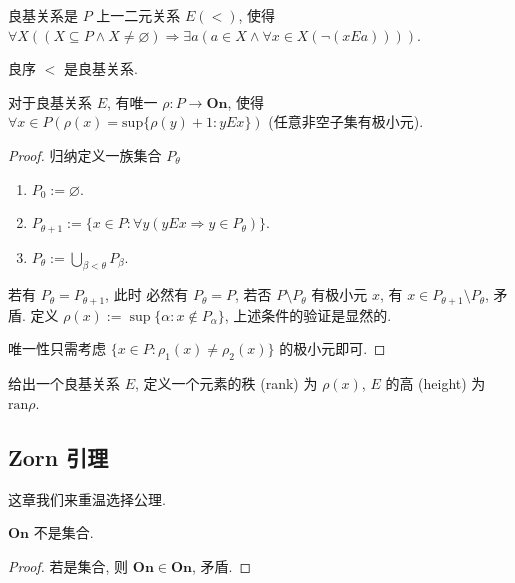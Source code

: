 \begin{definition}
    良基关系是 \(P\) 上一二元关系 \(E (<)\), 使得 \(\forall X ((X \subseteq P \land X \neq \varnothing) \Rightarrow \exists a (a \in X \land \forall x \in X (\neg(x E a))))\).
\end{definition}

\begin{example}
    良序 \(<\) 是良基关系.
\end{example}

\begin{theorem}
    对于良基关系 \(E\), 有唯一 \(\rho : P \to \mathbf{On}\), 使得 \(\forall x \in P (\rho(x) = \mathrm{sup} \{\rho(y) + 1 : y E x\})\) (任意非空子集有极小元).

    \begin{proof}
        归纳定义一族集合 \(P_\theta\)

        \begin{enumerate}
            \item \(P_0 := \varnothing\).
            \item \(P_{\theta + 1} := \{x \in P : \forall y (y E x \Rightarrow y \in P_\theta)\}\).
            \item \(P_\theta := \bigcup_{\beta < \theta} P_\beta\).
        \end{enumerate}

        若有 \(P_\theta = P_{\theta + 1}\), 此时
        必然有 \(P_\theta = P\), 若否 \(P \setminus P_\theta\) 有极小元 \(x\), 有 \(x \in P_{\theta + 1} \setminus P_{\theta}\), 矛盾.
        定义 \(\rho(x) := \sup \{\alpha : x \notin P_{\alpha}\}\), 上述条件的验证是显然的.

        唯一性只需考虑 \(\{x \in P : \rho_1 (x) \neq \rho_2 (x)\}\) 的极小元即可.
    \end{proof}
\end{theorem}

\begin{definition}
    给出一个良基关系 \(E\), 定义一个元素的秩 (rank) 为 \(\rho(x)\), \(E\) 的高 (height) 为 \(\mathrm{ran} \rho\).
\end{definition}


\subsection{Zorn 引理}

这章我们来重温选择公理.

\begin{lemma}
    \label{lemma:On is not a set}
    \(\mathbf{On}\) 不是集合.

    \begin{proof}
        若是集合, 则 \(\mathbf{On} \in \mathbf{On}\), 矛盾.
    \end{proof}
\end{lemma}

